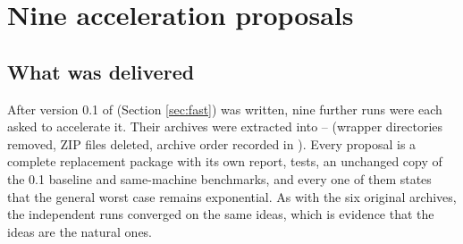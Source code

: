 
\section{Nine acceleration proposals}
\label{sec:proposals}

\subsection{What was delivered}
After version 0.1 of  (Section \ref{sec:fast}) was written, nine
further runs were each asked to accelerate it. Their archives were extracted
into -- (wrapper directories removed, ZIP files
deleted, archive order recorded in ). Every proposal
is a complete replacement package with its own report, tests, an unchanged
copy of the 0.1 baseline and same-machine benchmarks, and every one of them
states that the general worst case remains exponential. As with the six
original archives, the independent runs converged on the same ideas, which is
evidence that the ideas are the natural ones.

